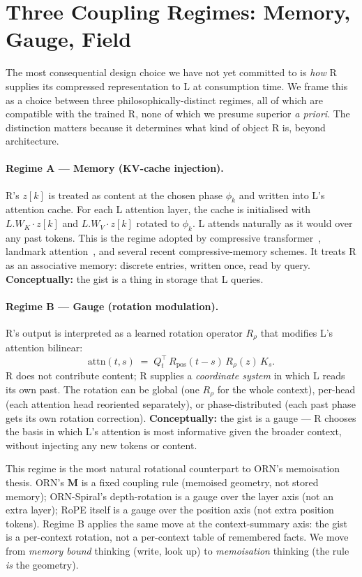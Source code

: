 \documentclass[10pt, twocolumn, a4paper]{article}
\newcommand{\M}{\mathbf{M}}
\begin{document}
\section{Three Coupling Regimes: Memory, Gauge, Field}
\label{sec:coupling}

The most consequential design choice we have not yet committed to is \emph{how} R supplies its compressed representation to L at consumption time. We frame this as a choice between three philosophically-distinct regimes, all of which are compatible with the trained R, none of which we presume superior \emph{a priori}. The distinction matters because it determines what kind of object R is, beyond architecture.

\paragraph{Regime A --- Memory (KV-cache injection).}
R's $z[k]$ is treated as content at the chosen phase $\phi_k$ and written into L's attention cache. For each L attention layer, the cache is initialised with $L.W_K \cdot z[k]$ and $L.W_V \cdot z[k]$ rotated to $\phi_k$. L attends naturally as it would over any past tokens. This is the regime adopted by compressive transformer~\cite{rae2019compressive}, landmark attention~\cite{mohtashami2023landmark}, and several recent compressive-memory schemes. It treats R as an associative memory: discrete entries, written once, read by query. \textbf{Conceptually:} the gist is a thing in storage that L queries.

\paragraph{Regime B --- Gauge (rotation modulation).}
R's output is interpreted as a learned rotation operator $R_\rho$ that modifies L's attention bilinear:
\[
\text{attn}(t, s) \;=\; Q_t^\top \, R_{\text{pos}}(t-s) \, R_{\rho}(z) \, K_s.
\]
R does not contribute content; R supplies a \emph{coordinate system} in which L reads its own past. The rotation can be global (one $R_\rho$ for the whole context), per-head (each attention head reoriented separately), or phase-distributed (each past phase gets its own rotation correction). \textbf{Conceptually:} the gist is a gauge --- R chooses the basis in which L's attention is most informative given the broader context, without injecting any new tokens or content.

This regime is the most natural rotational counterpart to ORN's memoisation thesis. ORN's $\M$ is a fixed coupling rule (memoised geometry, not stored memory); ORN-Spiral's depth-rotation is a gauge over the layer axis (not an extra layer); RoPE itself is a gauge over the position axis (not extra position tokens). Regime B applies the same move at the context-summary axis: the gist is a per-context rotation, not a per-context table of remembered facts. We move from \emph{memory bound} thinking (write, look up) to \emph{memoisation} thinking (the rule \emph{is} the geometry).
\end{document}
